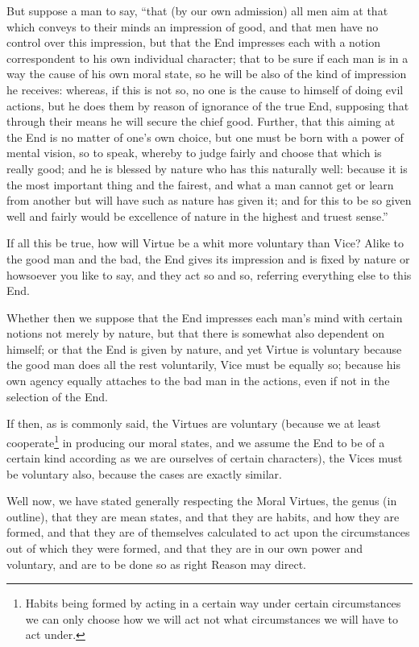 But suppose a man to say, “that (by our own admission) all men aim at
that which conveys to their minds an impression of good, and that men have no
control over this impression, but that the End impresses each with a notion
correspondent to his own individual character; that to be sure if each man is
in a way the cause of his own moral state, so he will be also of the kind of
impression he receives: whereas, if this is not so, no one is the cause to
himself of doing evil actions, but he does them by reason of ignorance of the
true End, supposing that through their means he will secure the chief good.
Further, that this aiming at the End is no matter of one’s own choice,
but one must be born with a power of mental vision, so to speak, whereby to
judge fairly and choose that which is really good; and he is blessed by nature
who has this naturally well: because it is the most important thing and the
fairest, and what a man cannot get or learn from another but will have such as
nature has given it; and for this to be so given well and fairly would be
excellence of nature in the highest and truest sense.”

If all this be true, how will Virtue be a whit more voluntary than Vice? Alike
to the good man and the bad, the End gives its impression and is fixed by
nature or howsoever you like to say, and they act so and so, referring
everything else to this End.

Whether then we suppose that the End impresses each man’s mind with
certain notions not merely by nature, but that there is somewhat also dependent
on himself; or that the End is given by nature, and yet Virtue is voluntary
because the good man does all the rest voluntarily, Vice must be equally so;
because his own agency equally attaches to the bad man in the actions, even if
not in the selection of the End.

If then, as is commonly said, the Virtues are voluntary (because we at least
cooperate\footnote{Habits being formed by acting in a certain way under certain circumstances we
can only choose how we will act not what circumstances we will have to act
under.}
in producing our moral states, and we assume the End to be of a certain kind
according as we are ourselves of certain characters), the Vices must be
voluntary also, because the cases are exactly similar.


Well now, we have stated generally respecting the Moral Virtues, the genus (in
outline), that they are mean states, and that they are habits, and how they are
formed, and that they are of themselves calculated to act upon the
circumstances out of which they were formed, and that they are in our own power
and voluntary, and are to be done so as right Reason may direct.

